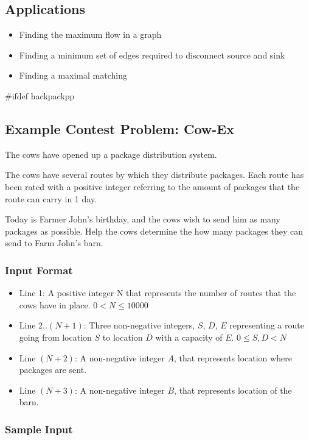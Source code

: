 \subsection{Applications}
\begin{itemize}
	\item Finding the maximum flow in a graph
	\item Finding a minimum set of edges required to disconnect source and sink
	\item Finding a maximal matching
\end{itemize}
#ifdef hackpackpp

\subsection{Example Contest Problem: Cow-Ex}
The cows have opened up a package distribution system.

The cows have several routes by which they distribute packages.
Each route has been rated with a positive integer referring to the amount of packages that the route can carry in 1 day.

Today is Farmer John's birthday, and the cows wish to send him as many packages as possible.
Help the cows determine the how many packages they can send to Farm John's barn.
\subsubsection{Input Format}
\begin{itemize}
	\item Line 1: A positive integer N that represents the number of routes that the cows have in place. $0 < N \leq 10000$
	\item Line 2..$(N+1)$: Three non-negative integers, $S$, $D$, $E$ representing a route going from location $S$ to location $D$ with a capacity of $E$. $0 \leq S,D < N$
	\item Line $(N+2)$: A non-negative integer $A$, that represents location where packages are sent.
	\item Line $(N+3)$: A non-negative integer $B$, that represents location of the barn.
\end{itemize}

\subsubsection{Sample Input}

